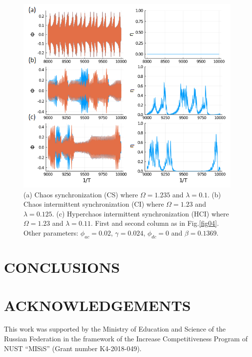 \documentclass[aps,pre,reprint,groupedaddress]{revtex4-1}
\begin{document}
\begin{figure}
	\includegraphics[scale=0.55]{Fig04_B}%
	\caption{(a) Chaos synchronization (CS) where $\Omega = 1.235$ and $\lambda=0.1$. (b) Chaos intermittent synchronization (CI) where $\Omega = 1.23$ and $\lambda=0.125$. (c) Hyperchaos intermittent synchronization (HCI) where $\Omega = 1.23$ and $\lambda=0.11$. First and second column as in Fig.\ref{fig04}. Other parameters: $\phi_{ac}=0.02$, $\gamma=0.024$, $\phi_{dc}=0$ and $\beta=0.1369$.} \label{fig05}
\end{figure}





\section{CONCLUSIONS}\label{real}


\section{ACKNOWLEDGEMENTS}
This work was supported by the Ministry of Education and Science of the Russian Federation in the framework of the Increase Competitiveness Program of NUST ``MISiS'' (Grant number K4-2018-049).


\end{document}
